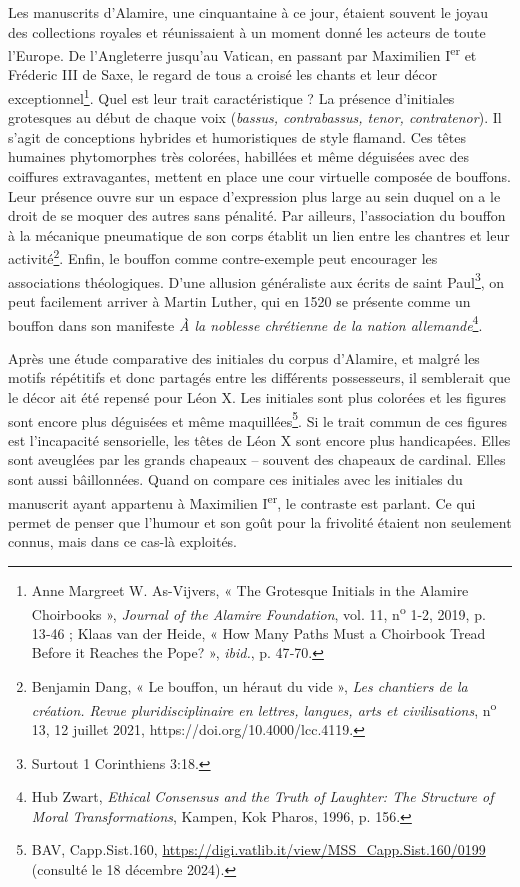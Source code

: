 \documentclass[12pt,twoside,openany]{book}
\begin{document}
Les manuscrits d’Alamire, une cinquantaine à ce jour, étaient souvent le joyau des collections royales et réunissaient à un moment donné les acteurs de toute l’Europe. De l’Angleterre jusqu’au Vatican, en passant par Maximilien I\textsuperscript{er} et Fréderic III de Saxe, le regard de tous a croisé les chants et leur décor exceptionnel\footnote{Anne Margreet W. As-Vijvers, « The Grotesque Initials in the Alamire Choirbooks », \textit{Journal of the Alamire Foundation}, vol. 11, n\textsuperscript{o} 1-2, 2019, p. 13‑46 ; Klaas van der Heide, « How Many Paths Must a Choirbook Tread Before it Reaches the Pope? », \textit{ibid.}, p. 47‑70.}. Quel est leur trait caractéristique ? La présence d’initiales grotesques au début de chaque voix (\textit{bassus, contrabassus, tenor, contratenor}). Il s’agit de conceptions hybrides et humoristiques de style flamand. Ces têtes humaines phytomorphes très colorées, habillées et même déguisées avec des coiffures extravagantes, mettent en place une cour virtuelle composée de bouffons. Leur présence ouvre sur un espace d’expression plus large au sein duquel on a le droit de se moquer des autres sans pénalité. Par ailleurs, l’association du bouffon à la mécanique pneumatique de son corps établit un lien entre les chantres et leur activité\footnote{Benjamin Dang, « Le bouffon, un héraut du vide », \textit{Les chantiers de la création. Revue pluridisciplinaire en lettres, langues, arts et civilisations}, n\textsuperscript{o} 13, 12 juillet 2021, https://doi.org/10.4000/lcc.4119.}. Enfin, le bouffon comme contre-exemple peut encourager les associations théologiques. D’une allusion généraliste aux écrits de saint Paul\footnote{Surtout 1 Corinthiens 3:18.}, on peut facilement arriver à Martin Luther, qui en 1520 se présente comme un bouffon dans son manifeste \textit{À la noblesse chrétienne de la nation allemande}\footnote{Hub Zwart, \textit{Ethical Consensus and the Truth of Laughter: The Structure of Moral Transformations}, Kampen, Kok Pharos, 1996, p. 156.}.

Après une étude comparative des initiales du corpus d’Alamire, et malgré les motifs répétitifs et donc partagés entre les différents possesseurs, il semblerait que le décor ait été repensé pour Léon X. Les initiales sont plus colorées et les figures sont encore plus déguisées et même maquillées\footnote{BAV, Capp.Sist.160, \href{https://digi.vatlib.it/view/MSS\_Capp.Sist.160/0199}{https://digi.vatlib.it/view/MSS\_Capp.Sist.160/0199} (consulté le 18 décembre 2024).}. Si le trait commun de ces figures est l’incapacité sensorielle, les têtes de Léon X sont encore plus handicapées. Elles sont aveuglées par les grands chapeaux – souvent des chapeaux de cardinal. Elles sont aussi bâillonnées. Quand on compare ces initiales avec les initiales du manuscrit ayant appartenu à Maximilien I\textsuperscript{er}, le contraste est parlant. Ce qui permet de penser que l’humour et son goût pour la frivolité étaient non seulement connus, mais dans ce cas-là exploités.
\end{document}
